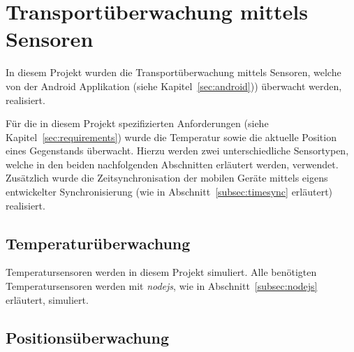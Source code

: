 \section{Transportüberwachung mittels Sensoren}\label{sensors}
\label{sec:sensors}

In diesem Projekt wurden die Transportüberwachung mittels Sensoren, welche
	von der Android Applikation (siehe Kapitel~\ref{sec:android})) überwacht
	werden, realisiert.
	
Für die in diesem Projekt spezifizierten Anforderungen (siehe Kapitel~\ref{sec:requirements})
	wurde die Temperatur sowie die aktuelle Position eines Gegenstands überwacht. Hierzu
	werden zwei unterschiedliche Sensortypen, welche in den beiden nachfolgenden Abschnitten
	erläutert werden, verwendet. Zusätzlich wurde die Zeitsynchronisation der mobilen Geräte
	mittels eigens entwickelter Synchronisierung (wie in Abschnitt~\ref{subsec:timesync}
	erläutert) realisiert.

\subsection{Temperaturüberwachung}

Temperatursensoren werden in diesem Projekt simuliert. Alle benötigten
	Temperatursensoren werden mit \emph{nodejs}, wie in
	Abschnitt~\ref{subsec:nodejs} erläutert, simuliert.

\subsection{Positionsüberwachung}
